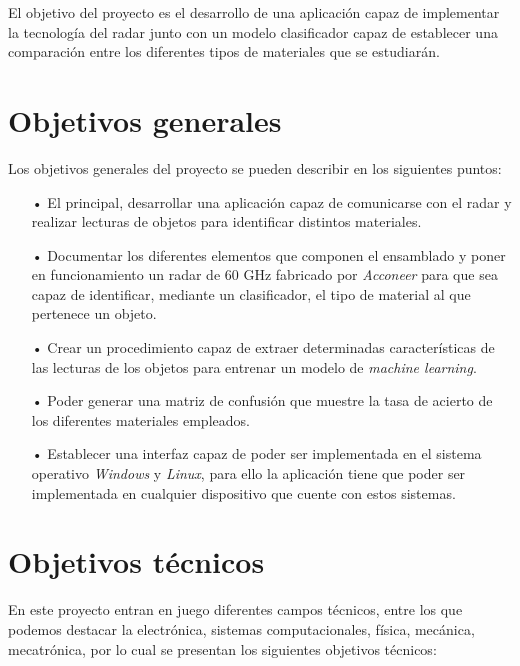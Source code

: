 
El objetivo del proyecto es el desarrollo de una aplicación capaz de implementar la tecnología del radar junto con un modelo clasificador capaz de establecer una comparación entre los diferentes tipos de materiales que se estudiarán.

\section{Objetivos generales}

Los objetivos generales del proyecto se pueden describir en los siguientes puntos:
\begin{itemize}
\item[•] El principal, desarrollar una aplicación capaz de comunicarse con el radar y realizar lecturas de objetos para identificar distintos materiales.

\item[•] Documentar los diferentes elementos que componen el ensamblado y poner en funcionamiento un radar de 60 GHz fabricado por \textit{Acconeer} para que sea capaz de identificar, mediante un clasificador, el tipo de material al que pertenece un objeto.

\item[•] Crear un procedimiento capaz de extraer determinadas características de las lecturas de los objetos para entrenar un modelo de \textit{machine learning}.

\item[•] Poder generar una matriz de confusión que muestre la tasa de acierto de los diferentes materiales empleados.

\item[•] Establecer una interfaz capaz de poder ser implementada en el sistema operativo \textit{Windows} y \textit{Linux}, para ello la aplicación tiene que poder ser implementada en cualquier dispositivo que cuente con estos sistemas.
\end{itemize}

\section{Objetivos técnicos}

En este proyecto entran en juego diferentes campos técnicos, entre los que podemos destacar la electrónica, sistemas computacionales, física, mecánica, mecatrónica, por lo cual se presentan los siguientes objetivos técnicos:

